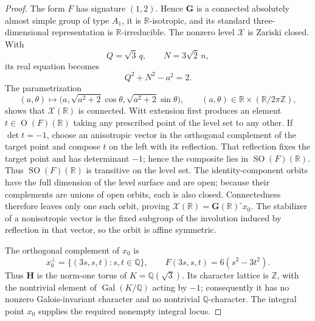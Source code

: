 \begin{proof}
The form \(F\) has signature \((1,2)\).  Hence \(\mathbf G\) is a
connected absolutely almost simple group of type \(A_1\), it is
\(\mathbb R\)-isotropic, and its standard three-dimensional representation
is \(\mathbb R\)-irreducible.  The nonzero level \(\mathscr X\) is
Zariski closed.  With
\[
 Q=\sqrt3\,q,
 \qquad
 N=3\sqrt2\,n,
\]
its real equation becomes
\[
 Q^2+N^2-a^2=2.
\]
The parametrization
\[
 (a,\theta)\longmapsto
 \bigl(a,\sqrt{a^2+2}\cos\theta,
          \sqrt{a^2+2}\sin\theta\bigr),
 \qquad (a,\theta)\in\mathbb R\times(\mathbb R/2\pi\mathbb Z),
\]
shows that \(\mathscr X(\mathbb R)\) is connected.  Witt extension first
produces an element \(t\in\operatorname O(F)(\mathbb R)\) taking any
prescribed point of the level set to any other.  If \(\det t=-1\), choose
an anisotropic vector in the orthogonal complement of the target point and
compose \(t\) on the left with its reflection.  That reflection fixes the
target point and has determinant \(-1\); hence the composite lies in
\(\operatorname{SO}(F)(\mathbb R)\).  Thus
\(\operatorname{SO}(F)(\mathbb R)\) is transitive on the level set.  The
identity-component orbits have the full dimension of the level surface and
are open; because their complements are unions of open orbits, each is also
closed.  Connectedness therefore leaves only one such orbit, proving
\(\mathscr X(\mathbb R)=\mathbf G(\mathbb R)^\circ x_0\).  The stabilizer
of a nonisotropic vector is the fixed subgroup of the involution induced by
reflection in that vector, so the orbit is affine symmetric.

The orthogonal complement of \(x_0\) is
\begin{equation}
 x_0^\perp=\{(3s,s,t):s,t\in\mathbb Q\},
 \qquad
 F(3s,s,t)=6(s^2-3t^2).
 \label{koide-count-eq-rational-complement}
\end{equation}
Thus \(\mathbf H\) is the norm-one torus of
\(K=\mathbb Q(\sqrt3)\).  Its character lattice is \(\mathbb Z\), with
the nontrivial element of \(\operatorname{Gal}(K/\mathbb Q)\) acting by
\(-1\); consequently it has no nonzero Galois-invariant character and no
nontrivial \(\mathbb Q\)-character.  The integral point \(x_0\) supplies
the required nonempty integral locus.


\end{proof}
